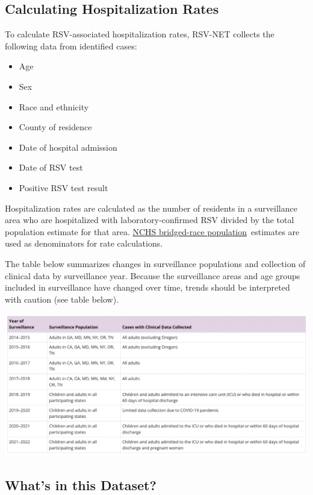 \documentclass[
  letterpaper,
  DIV=11,
  numbers=noendperiod]{scrreport}
\begin{document}
\hypertarget{calculating-hospitalization-rates}{%
\subsection{\texorpdfstring{\textbf{Calculating Hospitalization
Rates}}{Calculating Hospitalization Rates}}\label{calculating-hospitalization-rates}}

To calculate RSV-associated hospitalization rates, RSV-NET collects the
following data from identified cases:

\begin{itemize}
\item
  Age
\item
  Sex
\item
  Race and ethnicity
\item
  County of residence
\item
  Date of hospital admission
\item
  Date of RSV test
\item
  Positive RSV test result
\end{itemize}

Hospitalization rates are calculated as the number of residents in a
surveillance area who are hospitalized with laboratory-confirmed RSV
divided by the total population estimate for that area.
\href{https://www.cdc.gov/nchs/nvss/bridged_race.htm}{NCHS bridged-race
population}~estimates are used as denominators for rate calculations.

The table below summarizes changes in surveillance populations and
collection of clinical data by surveillance year. Because the
surveillance areas and age groups included in surveillance have changed
over time, trends should be interpreted with caution (see table below).

\includegraphics{./images/paste-72BAB924.png}

\hypertarget{whats-in-this-dataset}{%
\subsection{What's in this Dataset?}\label{whats-in-this-dataset}}
\end{document}
